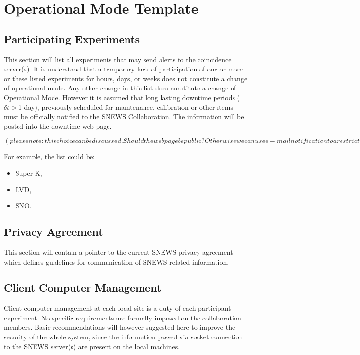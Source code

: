 \documentclass{article}
\begin{document}
\section{Operational Mode Template}

\subsection{Participating Experiments}

This section will list all experiments that may send alerts to the
coincidence server(s).  It is understood that a temporary lack of
participation of one or more or these listed experiments for hours,
days, or weeks does not constitute a change of operational mode.  Any
other change in this list does constitute a change of Operational
Mode. However it is assumed that long lasting downtime periods
($\delta t>$1 day), previously scheduled for maintenance, calibration
or other items, must be officially notified to the SNEWS
Collaboration. The information will be posted into the downtime web
page.

$(please note: this choice can be discussed. Should the web page be public? 
Otherwise we can use e-mail notification to a restricted  subgroup inside the 
collaboration).$

 For example, the list could be:

\begin{itemize}
\item Super-K,
\item LVD,
\item SNO.
\end{itemize}

\subsection{Privacy Agreement}
This section will contain a pointer to the current SNEWS privacy
agreement, which defines guidelines for communication
of SNEWS-related information.

\subsection{Client Computer Management}

Client computer management at each local site is a duty of each
participant experiment. No specific requirements are formally imposed
on the collaboration members. Basic recommendations will however
suggested here to improve the security of the whole system, since the
information passed via socket connection to the SNEWS server(s) are
present on the local machines.
\end{document}
